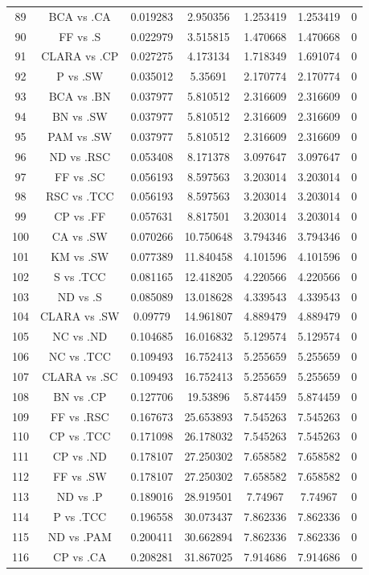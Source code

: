 \documentclass[a4paper,10pt]{article}
\begin{document}
\begin{landscape}
\begin{table}[!htp]
\begin{tabular}{ccccccc}
89&BCA vs .CA&0.019283&2.950356&1.253419&1.253419&0\\
90&FF vs .S&0.022979&3.515815&1.470668&1.470668&0\\
91&CLARA vs .CP&0.027275&4.173134&1.718349&1.691074&0\\
92&P vs .SW&0.035012&5.35691&2.170774&2.170774&0\\
93&BCA vs .BN&0.037977&5.810512&2.316609&2.316609&0\\
94&BN vs .SW&0.037977&5.810512&2.316609&2.316609&0\\
95&PAM vs .SW&0.037977&5.810512&2.316609&2.316609&0\\
96&ND vs .RSC&0.053408&8.171378&3.097647&3.097647&0\\
97&FF vs .SC&0.056193&8.597563&3.203014&3.203014&0\\
98&RSC vs .TCC&0.056193&8.597563&3.203014&3.203014&0\\
99&CP vs .FF&0.057631&8.817501&3.203014&3.203014&0\\
100&CA vs .SW&0.070266&10.750648&3.794346&3.794346&0\\
101&KM vs .SW&0.077389&11.840458&4.101596&4.101596&0\\
102&S vs .TCC&0.081165&12.418205&4.220566&4.220566&0\\
103&ND vs .S&0.085089&13.018628&4.339543&4.339543&0\\
104&CLARA vs .SW&0.09779&14.961807&4.889479&4.889479&0\\
105&NC vs .ND&0.104685&16.016832&5.129574&5.129574&0\\
106&NC vs .TCC&0.109493&16.752413&5.255659&5.255659&0\\
107&CLARA vs .SC&0.109493&16.752413&5.255659&5.255659&0\\
108&BN vs .CP&0.127706&19.53896&5.874459&5.874459&0\\
109&FF vs .RSC&0.167673&25.653893&7.545263&7.545263&0\\
110&CP vs .TCC&0.171098&26.178032&7.545263&7.545263&0\\
111&CP vs .ND&0.178107&27.250302&7.658582&7.658582&0\\
112&FF vs .SW&0.178107&27.250302&7.658582&7.658582&0\\
113&ND vs .P&0.189016&28.919501&7.74967&7.74967&0\\
114&P vs .TCC&0.196558&30.073437&7.862336&7.862336&0\\
115&ND vs .PAM&0.200411&30.662894&7.862336&7.862336&0\\
116&CP vs .CA&0.208281&31.867025&7.914686&7.914686&0\\

\end{tabular}
\end{table}
\end{landscape}
\end{document}
